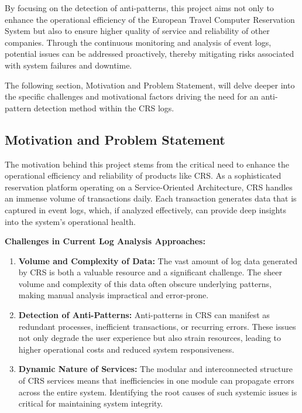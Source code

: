 \documentclass[12pt, times]{article}
\begin{document}
	\hspace*{5mm}By focusing on the detection of anti-patterns, this project aims not only to enhance the operational efficiency of the European Travel Computer Reservation System but also to ensure higher quality of service and reliability of other companies. Through the continuous monitoring and analysis of event logs, potential issues can be addressed proactively, thereby mitigating risks associated with system failures and downtime.
	
	\hspace*{5mm}The following section, Motivation and Problem Statement, will delve deeper into the specific challenges and motivational factors driving the need for an anti-pattern detection method within the CRS logs.
	
\subsection{Motivation and Problem Statement}
\hspace*{5mm}The motivation behind this project stems from the critical need to enhance the operational efficiency and reliability of products like CRS. As a sophisticated reservation platform operating on a Service-Oriented Architecture, CRS handles an immense volume of transactions daily. Each transaction generates data that is captured in event logs, which, if analyzed effectively, can provide deep insights into the system’s operational health.

\textbf{Challenges in Current Log Analysis Approaches:}
\begin{enumerate}
	\item \textbf{Volume and Complexity of Data:} The vast amount of log data generated by CRS is both a valuable resource and a significant challenge. The sheer volume and complexity of this data often obscure underlying patterns, making manual analysis impractical and error-prone.
	\item \textbf{Detection of Anti-Patterns:} Anti-patterns in CRS can manifest as redundant processes, inefficient transactions, or recurring errors. These issues not only degrade the user experience but also strain resources, leading to higher operational costs and reduced system responsiveness.
	\item \textbf{Dynamic Nature of Services:} The modular and interconnected structure of CRS services means that inefficiencies in one module can propagate errors across the entire system. Identifying the root causes of such systemic issues is critical for maintaining system integrity.
\end{enumerate}
\end{document}

